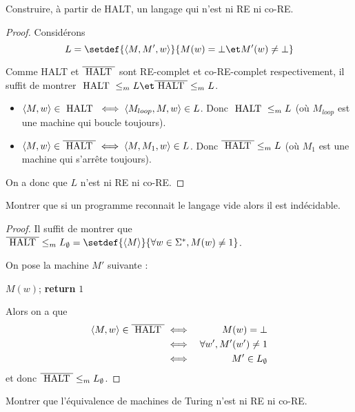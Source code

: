 \begin{exercice}
	Construire, à partir de HALT, un langage qui n'est ni RE ni co-RE.
\end{exercice}

\begin{proof}
	Considérons
	$$ L = \setdef {\encode {M,M',w}} {M(w) = \bot \et M'(w) \neq \bot} $$

	Comme HALT et $\overline {\text{ HALT }}$ sont RE-complet et co-RE-complet respectivement, il suffit de montrer $\halt \leqm L \et \overline{\halt} \leqm L$.

	\begin{itemize}
		\item $\left\langle M,w\right\rangle \in \text{ HALT } \iff \left\langle M_{loop}, M, w\right\rangle \in L$. Donc $\text{ HALT } \leq_m L$ (où $M_{loop}$ est une machine qui boucle toujours).
		\item $\left\langle M,w\right\rangle \in \overline{\text{ HALT }} \iff \left\langle M, M_1, w\right\rangle \in L$. Donc $\overline{\text{ HALT }} \leq_m L$ (où $M_1$ est une machine qui s'arrête toujours).
	\end{itemize}

	On a donc que $L$ n'est ni RE ni co-RE.
\end{proof}

\begin{exercice}
	Montrer que si un programme reconnait le langage vide alors il est indécidable.
\end{exercice}

\begin{proof}
	Il suffit de montrer que $\overline{\halt} \leqm L_{\emptyset} = \setdef{\encode M} {\forall w \in \mots, M(w) \neq 1}$.

	On pose la machine $M'$ suivante :
	\begin{algorithmic}[lines]
		\State $M(w)$;
		\State \textbf{return} $1$
		\EndFunction
	\end{algorithmic}

	Alors on a que
	\begin{eqnarray*}
		\left\langle M,w\right\rangle \in \overline{\text{ HALT }} &\iff& M(w) = \bot \\
		&\iff& \forall w', M'(w') \neq 1 \\
		&\iff& M' \in L_{\emptyset}
	\end{eqnarray*} et donc $\overline{\text{ HALT }} \leq_m L_{\emptyset}$.

\end{proof}


\begin{exercice}
	Montrer que l'équivalence de machines de Turing n'est ni RE ni co-RE.
\end{exercice}


